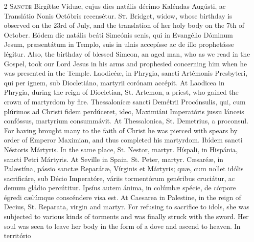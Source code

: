 \begin{paracol}{2}
\lettrine[lines=2]{S}{anctæ} Birgíttæ Víduæ, 
 cujus dies natális décimo Kaléndas Augústi, ac Translátio Nonis Octóbris 
 recensétur.
\switchcolumn
{}
\lettrine[lines=2]{S}{t.} Bridget, widow, whose birthday 
 is observed on the 23rd of July, and the translation of her holy body on the 
 7th of October.
\switchcolumn*
{}
Eódem die natális beáti 
 Simeónis senis, qui in Evangélio Dóminum Jesum, præsentátum in Templo, suis 
 in ulnis accepísse ac de illo prophetásse légitur.
\switchcolumn
{}
Also, the birthday of blessed 
 Simeon, an aged man, who as we read in the Gospel, took our Lord Jesus in 
 his arms and prophesied concerning him when he was presented in the Temple.
\switchcolumn*
{}
Laodicéæ, in Phrygia, 
 sancti Artémonis Presbyteri, qui per ignem, sub Diocletiáno, martyrii 
 corónam accépit.
\switchcolumn
{}
At Laodicea in Phrygia, during the 
 reign of Diocletian, St. Artemon, a priest, who gained the crown of 
 martyrdom by fire.
\switchcolumn*
{}
Thessalonícæ sancti 
 Demétrii Procónsulis, qui, cum plúrimos ad Christi fidem perdúceret, ideo, 
 Maximiáni Imperatóris jussu lánceis confóssus, martyrium consummávit.
\switchcolumn
{}
At Thessalonica, St. Demetrius, a 
 proconsul. For having brought many to the faith of Christ he was 
 pierced with spears by order of Emperor Maximian, and thus completed his 
 martyrdom.
\switchcolumn*
{}
Ibídem sancti Néstoris 
 Mártyris.
\switchcolumn
{}
In the same place, St. Nestor, 
 martyr.
\switchcolumn*
{}
Híspali, in Hispánia, 
 sancti Petri Mártyris.
\switchcolumn
{}
At Seville in Spain, St. Peter, 
 martyr.
\switchcolumn*
{}
Cæsaréæ, in Palæstína, 
 pássio sanctæ Reparátæ, Vírginis et Mártyris; quæ, cum nollet idólis 
 sacrificáre, sub Décio Imperatóre, váriis tormentórum genéribus cruciátur, 
 ac demum gládio percútitur. Ipsíus autem ánima, in colúmbæ spécie, de 
 córpore égredi cælúmque conscéndere visa est.
\switchcolumn
{}
At Caesarea in Palestine, in the 
 reign of Decius, St. Reparata, virgin and martyr. For refusing to 
 sacrifice to idols, she was subjected to various kinds of torments and was 
 finally struck with the sword. Her soul was seen to leave her body in 
 the form of a dove and ascend to heaven.
\switchcolumn*
{}
In território 

\end{paracol}
